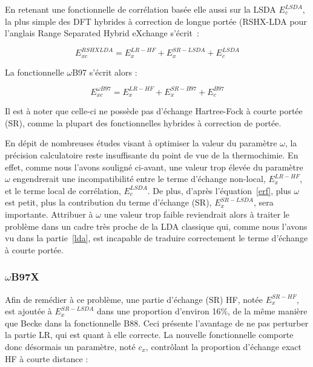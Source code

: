 	En retenant une fonctionnelle de corrélation basée elle aussi sur la LSDA $E_{c}^{LSDA}$, la plus simple des DFT hybrides à correction de longue portée (RSHX-LDA pour l’anglais \og Range Separated Hybrid eXchange \fg{} \cite{angyan2005van} s'écrit~:
	
	\begin{equation}
	E_{xc}^{RSHXLDA} = E_{x}^{LR-HF} + E_{x}^{SR-LSDA} + E_{c}^{LSDA}
	\end{equation}
	
	La fonctionnelle $\omega$B97\cite{chai2008long} s'écrit alors :
	
	\begin{equation}
	E_{xc}^{\omega B97} = E_{x}^{LR-HF} + E_{x}^{SR-B97} + E_{c}^{B97}
	\end{equation}
	
	Il est à noter que celle-ci ne possède pas d'échange Hartree-Fock à courte portée (SR), comme la plupart des fonctionnelles hybrides à correction de portée.
	
	En dépit de nombreuses études visant à optimiser la valeur du paramètre $\omega$, la précision calculatoire reste insuffisante du point de vue de la thermochimie. En effet, comme nous l'avons souligné ci-avant, une valeur trop élevée du paramètre $\omega$ engendrerait une incompatibilité entre le terme d'échange non-local, $E_{x}^{LR-HF}$, et le terme local de corrélation, $E_{c}^{LSDA}$. De plus, d'après l'équation~\ref{erf}, plus $\omega$ est petit, plus la contribution du terme d'échange (SR), $E_{x}^{SR-LSDA}$, sera importante. Attribuer à $\omega$ une valeur trop faible reviendrait alors à traiter le problème dans un cadre très proche de la LDA classique qui, comme nous l'avons vu dans la partie~\ref{lda}, est incapable de traduire correctement le terme d'échange à courte portée.
	
	\subsubsection{$\omega$B97X}
	
	Afin de remédier à ce problème, une partie d'échange (SR) HF, notée $E_{x}^{SR-HF}$, est ajoutée à $E_{x}^{SR-LSDA}$ dans une proportion d'environ 16\%, de la même manière que Becke dans la fonctionnelle B88. Ceci présente l'avantage de ne pas perturber la partie LR, qui est quant à elle correcte. La nouvelle fonctionnelle comporte donc désormais un paramètre, noté $c_{x}$, contrôlant la proportion d'échange exact HF à courte distance :
	

